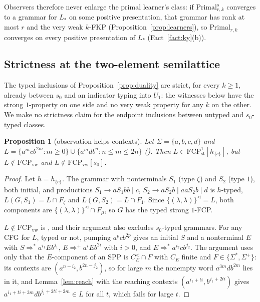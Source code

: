 \documentclass[11pt]{article}
\numberwithin{equation}{section}
\theoremstyle{plain}
\newtheorem{proposition}[theorem]{Proposition}
\theoremstyle{definition}
\theoremstyle{remark}
\theoremstyle{plain}
\newcommand{\eps}{\lambda}
\newcommand{\Lc}{^{\lhd}}
\newcommand{\FCP}[2]{\mathrm{FCP}^{#1}_{\mathrm{#2}}}
\newcommand{\tFCP}[3]{\mathrm{FCP}^{#1}_{\mathrm{#2}}[#3]}
\begin{document}
Observers therefore never enlarge the primal learner's class: if
$\mathrm{Primal}^s_{r,k}$ converges to a grammar for $L_*$ on some positive
presentation, that grammar has rank at most $r$ and the very weak $k$-FKP
(Proposition~\ref{prop:learners}), so $\mathrm{Primal}_{r,k}$ converges on
every positive presentation of $L_*$ (Fact~\ref{fact:ky}(b)).

\subsection*{Strictness at the two-element semilattice}

The typed inclusions of Proposition~\ref{prop:duality} are strict, for every
$k\ge1$, already between $s_0$ and an indicator typing into $U_1$: the
witnesses below have the strong $1$-property on one side and no
very weak property for any $k$ on the other.  We make no strictness claim
for the endpoint inclusions between untyped and $s_0$-typed classes.

\begin{proposition}[observation helps contexts]\label{prop:strict-context}
Let $\Sigma=\{a,b,c,d\}$ and
$L=\{a^mcb^{2m}:m\ge0\}\cup\{a^mdb^n:n\le m\le2n\}$
(\citealp[Prop.~2(i)]{ky2017}).  Then $L\in\tFCP1{st}{h_{\{c\}}}$, but
$L\notin\FCP{}{vw}$ and $L\notin\tFCP{}{vw}{s_0}$.
\end{proposition}
\begin{proof}
Let $h=h_{\{c\}}$.  The grammar with nonterminals $S_1$ (type $\zeta$) and
$S_2$ (type $1$), both initial, and productions
$S_1\to aS_1bb\mid c$, $S_2\to aS_2b\mid aaS_2b\mid d$ is $h$-typed,
$L(G,S_1)=L\cap F_\zeta$ and $L(G,S_2)=L\cap F_1$.  Since $\{(\eps,\eps)\}\Lc=L$,
both components are $\{(\eps,\eps)\}\Lc\cap F_\mu$, so $G$ has the typed strong
$1$-FCP.

$L\notin\FCP{}{vw}$ is \citet[Prop.~2(i)]{ky2017}, and their argument also
excludes $s_0$-typed grammars.  For any CFG for $L$, typed or not, pumping
$a^pcb^{2p}$ gives an initial $S$ and a nonterminal $E$ with
$S\Rightarrow^*a^{i_1}Eb^{j_1}$, $E\Rightarrow^+a^iEb^{2i}$ with $i>0$, and
$E\Rightarrow^*a^{i_2}cb^{j_2}$.  The argument uses only that the
$E$-component of an SPP is $C_E\Lc\cap F$ with $C_E$ finite and
$F\in\{\Sigma^*,\Sigma^+\}$: its contexts are $(a^{n-i_2},b^{2n-j_2})$, so for
large $m$ the nonempty word $a^{3m}db^{2m}$ lies in it, and
Lemma~\ref{lem:reach} with the reaching contexts $(a^{i_1+ti},b^{j_1+2ti})$
gives $a^{i_1+ti+3m}db^{j_1+2ti+2m}\in L$ for all $t$, which fails for large
$t$.
\end{proof}
\end{document}

